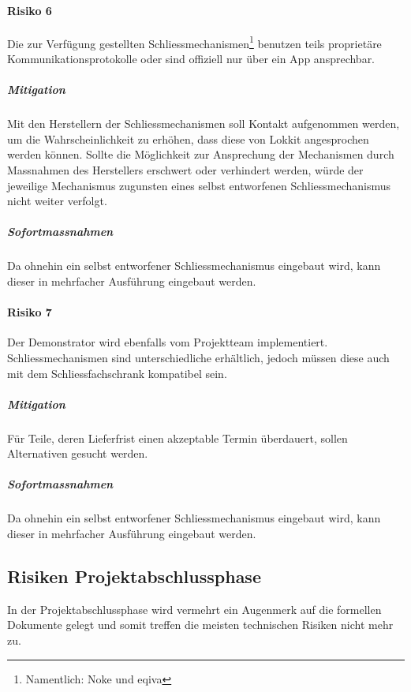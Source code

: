 \paragraph{Risiko 6}
Die zur Verfügung gestellten Schliessmechanismen\footnote{Namentlich: Noke und eqiva} benutzen teils proprietäre Kommunikationsprotokolle oder sind offiziell nur über ein App ansprechbar.
\subparagraph{Mitigation}
Mit den Herstellern der Schliessmechanismen soll Kontakt aufgenommen werden, um die Wahrscheinlichkeit zu erhöhen, dass diese von Lokkit angesprochen werden können. Sollte die Möglichkeit zur Ansprechung der Mechanismen durch Massnahmen des Herstellers erschwert oder verhindert werden, würde der jeweilige Mechanismus zugunsten eines selbst entworfenen Schliessmechanismus nicht weiter verfolgt.
\subparagraph{Sofortmassnahmen}
Da ohnehin ein selbst entworfener Schliessmechanismus eingebaut wird, kann dieser in mehrfacher Ausführung eingebaut werden.

\paragraph{Risiko 7}
Der Demonstrator wird ebenfalls vom Projektteam implementiert. Schliessmechanismen sind unterschiedliche erhältlich, jedoch müssen diese auch mit dem Schliessfachschrank kompatibel sein.
\subparagraph{Mitigation}
Für Teile, deren Lieferfrist einen akzeptable Termin überdauert, sollen Alternativen gesucht werden.
\subparagraph{Sofortmassnahmen}
Da ohnehin ein selbst entworfener Schliessmechanismus eingebaut wird, kann dieser in mehrfacher Ausführung eingebaut werden.


\subsection{Risiken Projektabschlussphase}
In der Projektabschlussphase wird vermehrt ein Augenmerk auf die formellen Dokumente gelegt und somit treffen die meisten technischen Risiken nicht mehr zu.

